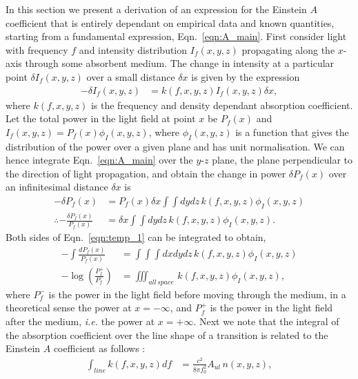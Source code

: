 \documentclass[%
 amsmath,amssymb,
aps,
]{revtex4-2}
\begin{document}
In this section we present a derivation of an expression for the Einstein \(A\) coefficient that is entirely dependant on empirical data and known quantities, starting from a fundamental expression, Eqn.~\ref{eqn:A_main}. First consider light with frequency \(f\) and intensity distribution \(I_{f}(x,y,z)\) propagating along the \(x\)-axis through some absorbent medium. The change in intensity at a particular point \(\delta I_{f} (x,y,z)\) over a small distance \(\delta x\) is given by the expression \cite{Huber1986}
\begin{align}
    - \delta I_{f} (x,y,z) &= k(f,x,y,z) I_{f} (x,y,z) \delta x \label{eqn:A_main},
\end{align}
where \(k(f,x,y,z)\) is the frequency and density dependant absorption coefficient. Let the total power in the light field at point \(x\) be \(P_{f}(x)\) and \(I_{f} (x,y,z) = P_{f}(x) \phi_I(x,y,z)\), where \(\phi_I(x,y,z)\) is a function that gives the distribution of the power over a given plane and has unit normalisation. We can hence integrate Eqn.~\ref{eqn:A_main} over the \(y\)-\(z\) plane, the plane perpendicular to the direction of light propagation, and obtain the change in power \(\delta P_f(x)\) over an infinitesimal distance \(\delta x\) is
\begin{align}
    - \delta P_{f}(x) &= P_{f}(x) \delta x \int \int  dy dz  \, k(f,x,y,z) \phi_I(x,y,z)\\
    \therefore - \frac{\delta P_{f}(x)}{P_{f}(x)} &= \delta x \int \int  dy dz \, k(f,x,y,z) \phi_I(x,y,z). \label{eqn:temp_1}
\end{align}
Both sides of Eqn.~\ref{eqn:temp_1} can be integrated to obtain,
\begin{align}
    - \int \frac{d P_{f}(x)}{P_{f}(x)} &= \int \int \int dx  dy dz \, k(f,x,y,z) \phi_I(x,y,z)\\
    -\log\left( \frac{P_{f}^+}{P_{f}^-} \right) &= \iiint_{all\, space} \, k(f,x,y,z) \phi_I(x,y,z) \label{eqn:temp_2},
\end{align}
where \(P_{f}^-\) is the power in the light field before moving through the medium, in a theoretical sense the power at \(x=-\infty\), and \(P_{f}^+\) is the power in the light field after the medium, \textit{i.e.} the power at \(x=+\infty\). Next we note that the integral of the absorption coefficient over the line shape of a transition is related to the Einstein \(A\) coefficient as follows \cite{Huber1986}:
\begin{align}
    \int_{line} k(f,x,y,z) df &= \frac{c^2}{8 \pi f_0^2} A_{ul} \, n(x,y,z),
\end{align}
\end{document}
